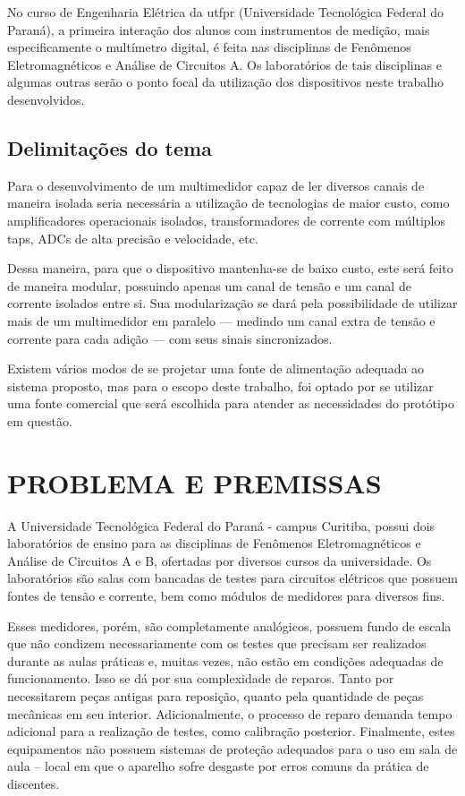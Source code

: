 No curso de Engenharia Elétrica da \gls{utfpr} (Universidade Tecnológica Federal do Paraná), a primeira interação dos alunos com instrumentos de medição, mais especificamente o multímetro digital, é feita nas disciplinas de Fenômenos Eletromagnéticos e Análise de Circuitos A. Os laboratórios de tais disciplinas e algumas outras serão o ponto focal da utilização dos dispositivos neste trabalho desenvolvidos.

\subsection{Delimitações do tema}\label{subsec:del-tema}
Para o desenvolvimento de um multimedidor capaz de ler diversos canais de maneira isolada seria necessária a utilização de tecnologias de maior custo, como amplificadores operacionais isolados, transformadores de corrente com múltiplos taps, \gls{ADC}s de alta precisão e velocidade, etc.

Dessa maneira, para que o dispositivo mantenha-se de baixo custo, este será feito de maneira modular, possuindo apenas um canal de tensão e um canal de corrente isolados entre si. Sua modularização se dará pela possibilidade de utilizar mais de um multimedidor em paralelo --- medindo um canal extra de tensão e corrente para cada adição --- com seus sinais sincronizados.

Existem vários modos de se projetar uma fonte de alimentação adequada ao sistema proposto, mas para o escopo deste trabalho, foi optado por se utilizar uma fonte comercial que será escolhida para atender as necessidades do protótipo em questão.

\section{PROBLEMA E PREMISSAS}\label{sec:probpremiss}
A Universidade Tecnológica Federal do Paraná - campus Curitiba, possui dois laboratórios de ensino para as disciplinas de Fenômenos Eletromagnéticos e Análise de Circuitos A e B, ofertadas por diversos cursos da universidade. Os laboratórios são salas com bancadas de testes para circuitos elétricos que possuem fontes de tensão e corrente, bem como módulos de medidores para diversos fins.

Esses medidores, porém, são completamente analógicos, possuem fundo de escala que não condizem necessariamente com os testes que precisam ser realizados durante as aulas práticas e, muitas vezes, não estão em condições adequadas de funcionamento. Isso se dá por sua complexidade de reparos. Tanto por necessitarem peças antigas para reposição, quanto pela quantidade de peças mecânicas em seu interior. Adicionalmente, o processo de reparo demanda tempo adicional para a realização de testes, como calibração posterior. Finalmente, estes equipamentos não possuem sistemas de proteção adequados para o uso em sala de aula – local em que o aparelho sofre desgaste por erros comuns da prática de discentes.

